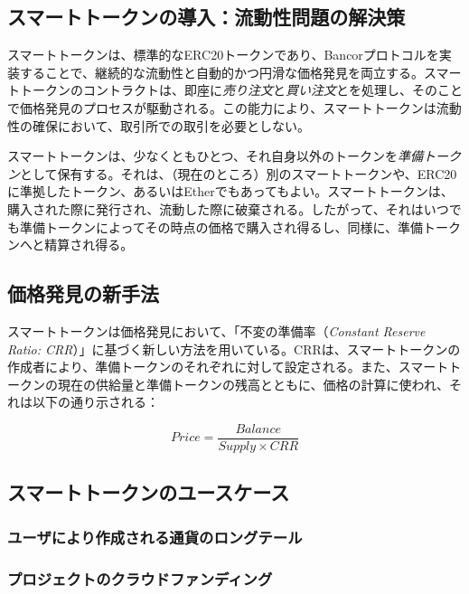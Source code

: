 \documentclass{jsarticle}
\begin{document}
  \subsection{スマートトークンの導入：流動性問題の解決策}

  スマートトークンは、標準的なERC20トークンであり、Bancorプロトコルを実装することで、継続的な流動性と自動的かつ円滑な価格発見を両立する。スマートトークンのコントラクトは、即座に\emph{売り注文}と\emph{買い注文}とを処理し、そのことで価格発見のプロセスが駆動される。この能力により、スマートトークンは流動性の確保において、取引所での取引を必要としない。

  スマートトークンは、少なくともひとつ、それ自身以外のトークンを\emph{準備トークン}として保有する。それは、（現在のところ）別のスマートトークンや、ERC20に準拠したトークン、あるいはEtherでもあってもよい。スマートトークンは、購入された際に発行され、流動した際に破棄される。したがって、それはいつでも準備トークンによってその時点の価格で購入され得るし、同様に、準備トークンへと精算され得る。

  \subsection{価格発見の新手法}

  スマートトークンは価格発見において、「不変の準備率（\textit{Constant Reserve Ratio: CRR}）」に基づく新しい方法を用いている。CRRは、スマートトークンの作成者により、準備トークンのそれぞれに対して設定される。また、スマートトークンの現在の供給量と準備トークンの残高とともに、価格の計算に使われ、それは以下の通り示される：

  \begin{equation*} \label{eq:price-discovery-formula}
    Price = \frac{Balance}{Supply \times CRR}
  \end{equation*}

  \subsection{スマートトークンのユースケース}



    \subsubsection{ユーザにより作成される通貨のロングテール}



    \subsubsection{プロジェクトのクラウドファンディング}
\end{document}
